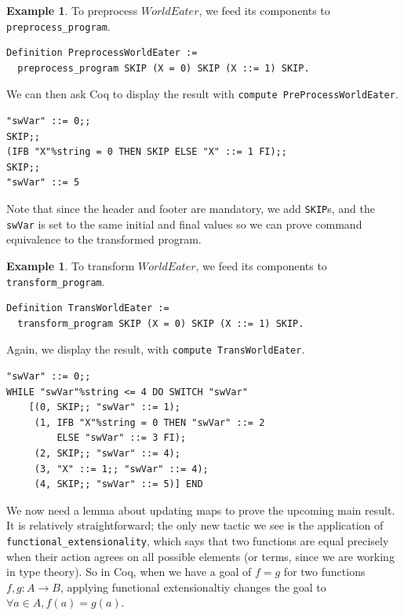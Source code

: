 \documentclass[12pt,notitlepage]{report}
\theoremstyle{plain}
\theoremstyle{definition}
\newtheorem{example}[theo]{Example}
\numberwithin{equation}{section}
\begin{document}
\begin{example}
To preprocess $WorldEater$, we feed its components to \verb$preprocess_program$.
\begin{verbatim}
Definition PreprocessWorldEater := 
  preprocess_program SKIP (X = 0) SKIP (X ::= 1) SKIP.
\end{verbatim}
We can then ask Coq to display the result with \verb$compute PreProcessWorldEater$.
\begin{verbatim}
"swVar" ::= 0;;
SKIP;;
(IFB "X"%string = 0 THEN SKIP ELSE "X" ::= 1 FI);;
SKIP;; 
"swVar" ::= 5
\end{verbatim}
Note that since the header and footer are mandatory, we add \verb$SKIP$s, and the \verb$swVar$ is set to the same initial and final values so we can prove command equivalence to the transformed program.
\end{example}

\begin{example}
To transform $WorldEater$, we feed its components to \verb$transform_program$.
\begin{verbatim}
Definition TransWorldEater := 
  transform_program SKIP (X = 0) SKIP (X ::= 1) SKIP.
\end{verbatim}
Again, we display the result, with \verb$compute TransWorldEater$.
\begin{verbatim}
"swVar" ::= 0;;
WHILE "swVar"%string <= 4 DO SWITCH "swVar"
    [(0, SKIP;; "swVar" ::= 1);
     (1, IFB "X"%string = 0 THEN "swVar" ::= 2
         ELSE "swVar" ::= 3 FI); 
     (2, SKIP;; "swVar" ::= 4);
     (3, "X" ::= 1;; "swVar" ::= 4);
     (4, SKIP;; "swVar" ::= 5)] END
\end{verbatim}
\end{example}

\noindent We now need a lemma about updating maps to prove the upcoming main result.  It is relatively straightforward; the only new tactic we see is the application of \verb$functional_extensionality$, which says that two functions are equal precisely when their action agrees on all possible elements (or terms, since we are working in type theory).  So in Coq, when we have a goal of $f=g$ for two functions $f,g: A \to B$, applying functional extensionaltiy changes the goal to $\forall a \in A, f(a) = g(a)$.
\end{document}
